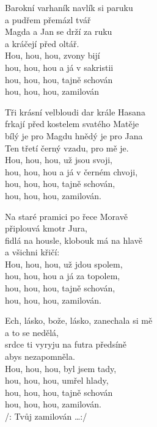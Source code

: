 
\ve{}
Barokní varhaník navlík si paruku\\
a pudřem přemázl tvář \\
Magda a Jan se drží za ruku \\
a kráčejí před oltář. \\
Hou, hou, hou, zvony bijí\\
hou, hou, hou a já v sakristii\\
hou, hou, hou, tajně schován\\
hou, hou, hou, zamilován 

\vspace{-0.1cm}

\ve{}
Tři krásní velbloudi dar krále Hasana\\
frkají před kostelem svatého Matěje\\
bílý je pro Magdu hnědý je pro Jana\\
Ten třetí černý vzadu, pro mě je.\\
Hou, hou, hou, už jsou svoji,\\
hou, hou, hou a já v černém chvoji,\\
hou, hou, hou, tajně schován,\\
hou, hou, hou, zamilován.

\vspace{-0.1cm}

\ve{}
Na staré pramici po řece Moravě\\
připlouvá kmotr Jura,\\
fidlá na housle, klobouk má na hlavě\\
a všichni křičí: \\
Hou, hou, hou, už jdou spolem,\\
hou, hou, hou a já za topolem,\\
hou, hou, hou, tajně schován,\\
hou, hou, hou, zamilován.

\vspace{-0.1cm}

\ve{}
Ech, lásko, bože, lásko, zanechala si mě\\
a to se nedělá,\\
srdce ti vyryju na futra předsíně\\
abys nezapomněla.\\
Hou, hou, hou, byl jsem tady,\\
hou, hou, hou, umřel hlady,\\
hou, hou, hou, tajně schován\\
hou, hou, hou, zamilován.\\
/: Tvůj zamilován \ldots :/

\esong